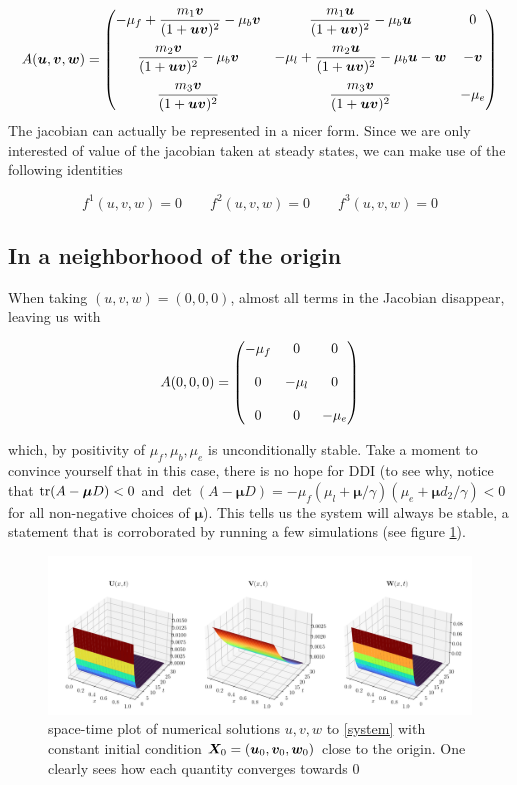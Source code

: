 $$
A(\bm{u}, \bm{v}, \bm{w}) = \begin{pmatrix}  -\mu_f +  \dfrac{m_1\bm{v}}{(1+\bm{u} \bm{v})^2} - \mu_b \bm{v} &  \dfrac{m_1 \bm{u}}{(1+\bm{u} \bm{v})^2} - \mu_b \bm{u} & 0 \\[1.2em]
 \dfrac{m_2 \bm{v}}{(1+\bm{u} \bm{v})^2} - \mu_b \bm{v}   & -\mu_l + \dfrac{m_2 \bm{u}}{(1+\bm{u} \bm{v})^2} - \mu_b \bm{u} - \bm{w}  & -\bm{v} \\[1.2em] 
  \dfrac{m_3 \bm{v}}{(1+\bm{u} \bm{v})^2} &  \dfrac{m_3 \bm{v}}{(1+\bm{u} \bm{v})^2} & -\mu_e \end{pmatrix}
$$
The jacobian can actually be represented in a nicer form. Since we are only interested of value of the jacobian taken at steady states, we can make use of the following identities 

\begin{equation}
	\label{identities}
	 f^1(u, v, w) = 0 \quad\quad f^2(u, v, w) = 0 \quad\quad f^3(u, v, w) = 0
\end{equation}


\subsection{In a neighborhood of the origin}

When taking $(u, v, w) = (0, 0, 0)$, almost all terms in the Jacobian disappear, leaving us with

$$
A(0, 0, 0) = \begin{pmatrix}  -\mu_f  &  0 & 0 \\[1.2em]
0  & -\mu_l & 0 \\[1.2em] 
0 & 0 & -\mu_e \end{pmatrix}
$$

which, by positivity of $\mu_f, \mu_b, \mu_e$ is unconditionally stable. Take a moment to convince yourself that in this case, there is no hope for DDI (to see why, notice that $\mathrm{tr} (A-\bm\mu D) < 0$ and $\det (A-\bm\mu D) = -\mu_f(\mu_l+ \bm\mu / \gamma)(\mu_e + \bm\mu d_2 / \gamma) < 0$ for all non-negative choices of $\bm\mu$). This tells us the system will always be stable, a statement that is corroborated by running a few simulations (see figure \ref{fig:simulations}).

\begin{figure}
	\centering
	\includegraphics[width=\textwidth]{figures/stable_origin.png}
	\caption{space-time plot of numerical solutions $u, v, w$ to \ref{system} with constant initial condition $\bm X_0 = (\bm{u}_0, \bm{v}_0, \bm{w}_0)$ close to the origin. One clearly sees how each quantity converges towards 0}
	\label{fig:simulations}
\end{figure}

